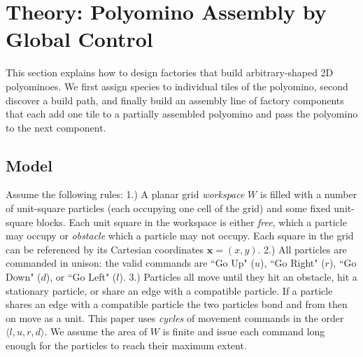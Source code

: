 \section{Theory: Polyomino Assembly by Global Control}\label{sec:Theory}

This section explains how to design factories that build arbitrary-shaped 2D polyominoes.
 We first assign species to individual tiles of the polyomino, second discover a build path, and finally build an assembly line of factory components that each add one tile to a partially assembled polyomino and pass the polyomino to the next component.



\subsection{Model}\label{subsec:model}
Assume the following rules:
1.) A planar  grid \emph{workspace} $W$ is filled with a number of unit-square particles (each occupying one cell of the grid)  and some fixed unit-square blocks.  Each unit square in the workspace is either  \emph{free}, which a particle may occupy or \emph{obstacle} which a particle may not occupy.  Each square in the grid can be referenced by its Cartesian coordinates $\bm{x}=(x,y)$.
2.) All particles are commanded in unison: the valid commands are  ``Go Up" ($u$), ``Go Right" ($r$), ``Go Down" ($d$), or ``Go Left" ($l$).  
3.) Particles all move until they  hit an obstacle, hit a stationary particle, or share an edge with a compatible particle.
If a particle shares an edge with a compatible particle the two particles bond and from then on move as a unit.
This paper uses \emph{cycles} of movement commands in the order $\langle l,u,r,d \rangle$. We assume the area of $W$ is finite and issue each command long enough for the particles to reach their maximum extent.


